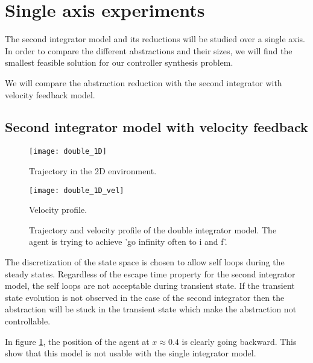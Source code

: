 \section{Single axis experiments}
The second integrator model and its reductions will be studied over a single axis.
In order to compare the different abstractions and their sizes, we will find the smallest feasible solution for our controller synthesis problem.

We will compare the abstraction reduction with the second integrator with velocity feedback model.


\subsection{Second integrator model with velocity feedback}
\begin{figure}[!ht]
	\begin{minipage}[b]{0.5\textwidth}
  		\centering
  		\texttt{[image: double\_1D]}
	  	\caption{Trajectory in the 2D environment.}
	  	\label{double_1D}
  \end{minipage}
	\begin{minipage}[b]{0.5\textwidth}
  		\centering
  		\texttt{[image: double\_1D\_vel]}
	  	\caption{Velocity profile.}
	  	\label{double_1D_vel}
  \end{minipage}
  \caption{Trajectory and velocity profile of the double integrator model. The agent is trying to achieve 'go infinity often to i and f'.}
\end{figure}

The discretization of the state space is chosen to allow self loops during the steady states.
Regardless of the escape time property for the second integrator model, the self loops are not acceptable during transient state. If the transient state evolution is not observed in the case of the second integrator then the abstraction will be stuck in the transient state which make the abstraction not controllable.

In figure \ref{double_1D_vel}, the position of the agent at $x\approx0.4$ is clearly going backward. This show that this model is not usable with the single integrator model.

